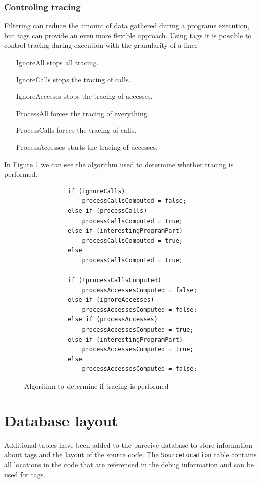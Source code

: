 \subsubsection{Controling tracing}
Filtering can reduce the amount of data gathered during a programs execution, but tags can provide an even more flexible approach. Using tags it is possible to control tracing during execution with the granularity of a line:

\begin{itemize}
	\item [IgnoreAll] stops all tracing.
	\item [IgnoreCalls] stops the tracing of calls.
	\item [IgnoreAccesses] stops the tracing of accesses.
	\item [ProcessAll] forces the tracing of everything.
	\item [ProcessCalls] forces the tracing of calls.
	\item [ProcessAccesses] starts the tracing of accesses.
\end{itemize}

In Figure \ref{cap3:contralg} we can see the algorithm used to determine whether tracing is performed.

\begin{figure}
	\begin{center}
		\begin{verbatim}
			if (ignoreCalls)
				processCallsComputed = false;
			else if (processCalls)
				processCallsComputed = true;
			else if (interestingProgramPart)
				processCallsComputed = true;
			else
				processCallsComputed = true;
			
			if (!processCallsComputed)
				processAccessesComputed = false;
			else if (ignoreAccesses)
				processAccessesComputed = false;
			else if (processAccesses)
				processAccessesComputed = true;
			else if (interestingProgramPart)
				processAccessesComputed = true;
			else
				processAccessesComputed = false;
		\end{verbatim}
	\end{center}
	\caption{Algorithm to determine if tracing is performed}
	\label{cap3:contralg}
\end{figure}

\section{Database layout}

Additional tables have been added to the parceive database to store information about tags and the layout of the source code. The \texttt{SourceLocation} table contains all locations in the code that are referenced in the debug information and can be used for tags.

